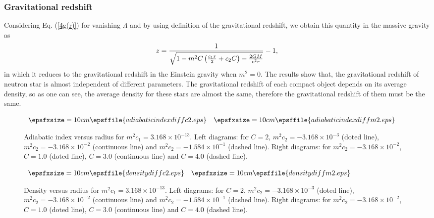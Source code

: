 \documentclass[aps]{revtex4}
\begin{document}
\subsubsection{Gravitational redshift}

Considering Eq. (\ref{4g(r)}) for vanishing $\Lambda $ and by using
definition of the gravitational redshift, we obtain this quantity in the
massive gravity as
\begin{equation}
z=\frac{1}{\sqrt{1-m^{2}C\left( \frac{c_{1}r}{2}+c_{2}C\right) -\frac{2GM}{%
c^{2}r}}}-1,
\end{equation}%
in which it reduces to the gravitational redshift in the Einstein gravity
when $m^{2}=0$. The results show that, the gravitational redshift of neutron
star is almost independent of different parameters. The gravitational
redshift of each compact object depends on its average density, so as one
can see, the average density for these stars are almost the same, therefore
the gravitational redshift of them must be the same.%
\begin{figure}[tbp]
$%
\begin{array}{cc}
\epsfxsize=10cm \epsffile{adiabaticindexdiffc2.eps} & \epsfxsize=10cm %
\epsffile{adiabaticindexdiffm2.eps}%
\end{array}
$%
\caption{Adiabatic index versus radius for $m^{2}c_{1}=3.168\times 10^{-13}$.%
\newline
Left diagrams: for $C=2$, $m^{2}c_{2}=-3.168\times 10^{-3}$ (doted line), $%
m^{2}c_{2}=-3.168\times 10^{-2}$ (continuous line) and $m^{2}c_{2}=-1.584%
\times 10^{-1}$ (dashed line). \newline
Right diagrams: for $m^{2}c_{2}=-3.168\times 10^{-2}$, $C=1.0$ (doted line),
$C=3.0$ (continuous line) and $C=4.0$ (dashed line).}
\label{Fig5}
\end{figure}


\begin{figure}[tbp]
$%
\begin{array}{cc}
\epsfxsize=10cm \epsffile{densitydiffc2.eps} & \epsfxsize=10cm %
\epsffile{densitydiffm2.eps}%
\end{array}
$%
\caption{Density versus radius for $m^{2}c_{1}=3.168\times 10^{-13}$.\newline
Left diagrams: for $C=2$, $m^{2}c_{2}=-3.168\times 10^{-3}$ (doted line), $%
m^{2}c_{2}=-3.168\times 10^{-2}$ (continuous line) and $m^{2}c_{2}=-1.584%
\times 10^{-1}$ (dashed line). \newline
Right diagrams: for $m^{2}c_{2}=-3.168\times 10^{-2}$, $C=1.0$ (doted line),
$C=3.0$ (continuous line) and $C=4.0$ (dashed line).}
\label{Fig6}
\end{figure}
\end{document}
